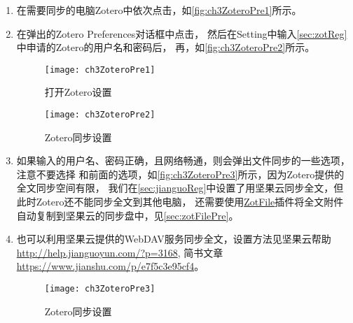 \documentclass[cn,11pt,chinese]{elegantbook}
\begin{document}
		\begin{enumerate}
			\item 
			在需要同步的电脑Zotero中依次点击，如\autoref{fig:ch3ZoteroPre1}所示。
			\item
			在弹出的Zotero Preferences对话框中点击，
			然后在Setting中输入\cref{sec:zotReg}中申请的Zotero的用户名和密码后，
			再，如\autoref{fig:ch3ZoteroPre2}所示。
				\begin{figure}[t]
					\centering
					\begin{minipage}[t]{\dimexpr0.5\textwidth-4em}
						\centering
						\texttt{[image: ch3ZoteroPre1]}
						\caption{打开Zotero设置}
						\label{fig:ch3ZoteroPre1}
				\end{minipage}
				\begin{minipage}[t]{\dimexpr0.5\textwidth-4em}
					\centering
					\texttt{[image: ch3ZoteroPre2]}
					\caption{Zotero同步设置}
					\label{fig:ch3ZoteroPre2}
				\end{minipage}
			\end{figure}
			\item
			如果输入的用户名、密码正确，且网络畅通，则会弹出文件同步的一些选项，
			注意不要选择
			和前面的选项，如\autoref{fig:ch3ZoteroPre3}所示，因为Zotero提供的全文同步空间有限，
			我们在\cref{sec:jianguoReg}中设置了用坚果云同步全文，但此时Zotero还不能同步全文到其他电脑，
			还需要使用\href{http://zotfile.com/}{ZotFile}插件将全文附件自动复制到坚果云的同步盘中，见\cref{sec:zotFilePre}。
			\item				  	
			也可以利用坚果云提供的WebDAV服务同步全文，设置方法见坚果云帮助\url{http://help.jianguoyun.com/?p=3168},
			简书文章\url{https://www.jianshu.com/p/e7f5c3e95cf4}。			  
			\begin{figure}[htbp]
				\centering
				\texttt{[image: ch3ZoteroPre3]}
				\caption{Zotero同步设置}
				\label{fig:ch3ZoteroPre3}
			\end{figure}
		\end{enumerate}
		
		
		
\end{document}
